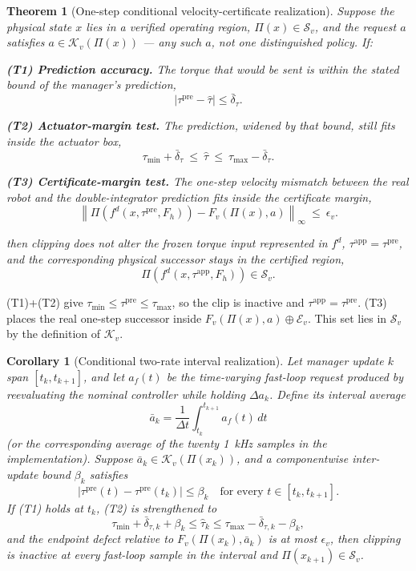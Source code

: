 \documentclass[journal]{IEEEtran}
\newtheorem{theorem}{Theorem}
\newtheorem{corollary}{Corollary}
\begin{document}
\begin{theorem}[One-step conditional velocity-certificate realization]
\label{thm:transfer}
Suppose the physical state $x$ lies in a verified operating region, $\Pi(x)\in\mathcal S_v$, and the request $a$ satisfies $a\in\mathcal K_v(\Pi(x))$ --- any such $a$, not one distinguished policy. If:

\textbf{(T1) Prediction accuracy.} The torque that would be sent is within the stated bound of the manager's prediction,
\[
\left|\tau^{\mathrm{pre}}-\hat\tau\right|\le\bar\delta_\tau.
\]

\textbf{(T2) Actuator-margin test.} The prediction, widened by that bound, still fits inside the actuator box,
\[
\tau_{\min}+\bar\delta_\tau\ \le\ \hat\tau\ \le\ \tau_{\max}-\bar\delta_\tau .
\]

\textbf{(T3) Certificate-margin test.} The one-step velocity mismatch between the real robot and the double-integrator prediction fits inside the certificate margin,
\[
\left\|\Pi\!\left(f^d(x,\tau^{\mathrm{pre}},F_h)\right)-F_v\!\left(\Pi(x),a\right)\right\|_\infty\ \le\ \epsilon_v .
\]

then clipping does not alter the frozen torque input represented in $f^d$, $\tau^{\mathrm{app}}=\tau^{\mathrm{pre}}$, and the corresponding physical successor stays in the certified region,
\[
\Pi\!\left(f^d(x,\tau^{\mathrm{app}},F_h)\right)\in\mathcal S_v .
\]
\end{theorem}

\begin{IEEEproof}
(T1)+(T2) give $\tau_{\min}\le\tau^{\mathrm{pre}}\le\tau_{\max}$, so the clip is inactive and $\tau^{\mathrm{app}}=\tau^{\mathrm{pre}}$.
(T3) places the real one-step successor inside $F_v(\Pi(x),a)\oplus\mathcal E_v$.
This set lies in $\mathcal S_v$ by the definition of $\mathcal K_v$.
\end{IEEEproof}

\begin{corollary}[Conditional two-rate interval realization]
\label{cor:tworate}
Let manager update $k$ span $[t_k,t_{k+1}]$, and let $a_f(t)$ be the time-varying fast-loop request produced by reevaluating the nominal controller while holding $\Delta a_k$. Define its interval average
\[
\bar a_k=\frac{1}{\Delta t}\int_{t_k}^{t_{k+1}}a_f(t)\,dt
\]
(or the corresponding average of the twenty 1~kHz samples in the implementation). Suppose $\bar a_k\in\mathcal K_v(\Pi(x_k))$, and a componentwise inter-update bound $\beta_k$ satisfies
\[
|\tau^{\mathrm{pre}}(t)-\tau^{\mathrm{pre}}(t_k)|\le\beta_k
\quad\text{for every }t\in[t_k,t_{k+1}].
\]
If (T1) holds at $t_k$, (T2) is strengthened to
\[
\tau_{\min}+\bar\delta_{\tau,k}+\beta_k
\le\hat\tau_k\le
\tau_{\max}-\bar\delta_{\tau,k}-\beta_k,
\]
and the endpoint defect relative to $F_v(\Pi(x_k),\bar a_k)$ is at most $\epsilon_v$, then clipping is inactive at every fast-loop sample in the interval and $\Pi(x_{k+1})\in\mathcal S_v$.
\end{corollary}
\end{document}
